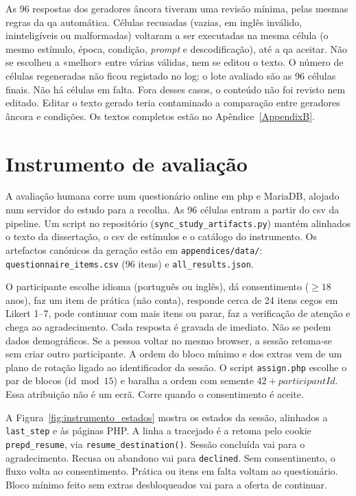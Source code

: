 As 96 respostas dos geradores âncora tiveram uma revisão mínima, pelas mesmas regras da \gls{qa} automática. Células recusadas (vazias, em inglês inválido, ininteligíveis ou malformadas) voltaram a ser executadas na mesma célula (o mesmo estímulo, época, condição, \textit{prompt} e descodificação), até a \gls{qa} aceitar. Não se escolheu a «melhor» entre várias válidas, nem se editou o texto. O número de células regeneradas não ficou registado no log; o lote avaliado são as 96 células finais. Não há células em falta. Fora desses casos, o conteúdo não foi revisto nem editado. Editar o texto gerado teria contaminado a comparação entre geradores âncora e condições. Os textos completos estão no Apêndice~\ref{AppendixB}.


\section{Instrumento de avaliação}
\label{sec:impl_questionario}

A avaliação humana corre num questionário online em \gls{php} e MariaDB, alojado num servidor do estudo para a recolha. As 96 células entram a partir do \gls{csv} da pipeline. Um script no repositório (\texttt{sync\_study\_artifacts.py}) mantém alinhados o texto da dissertação, o \gls{csv} de estímulos e o catálogo do instrumento. Os artefactos canónicos da geração estão em \texttt{appendices/data/}: \texttt{questionnaire\_items.csv} (96 itens) e \texttt{all\_results.json}.

O participante escolhe idioma (português ou inglês), dá consentimento (\(\ge 18\) anos), faz um item de prática (não conta), responde cerca de 24 itens cegos em Likert 1--7, pode continuar com mais itens ou parar, faz a verificação de atenção e chega ao agradecimento. Cada resposta é gravada de imediato. Não se pedem dados demográficos. Se a pessoa voltar no mesmo browser, a sessão retoma-se sem criar outro participante. A ordem do bloco mínimo e dos extras vem de um plano de rotação ligado ao identificador da sessão. O script \texttt{assign.php} escolhe o par de blocos (\(\mathrm{id}\bmod 15\)) e baralha a ordem com semente \(42 + \textit{participantId}\). Essa atribuição não é um ecrã. Corre quando o consentimento é aceite.

A Figura~\ref{fig:instrumento_estados} mostra os estados da sessão, alinhados a \texttt{last\_step} e às páginas PHP. A linha a tracejado é a retoma pelo cookie \texttt{prepd\_resume}, via \texttt{resume\_destination()}. Sessão concluída vai para o agradecimento. Recusa ou abandono vai para \texttt{declined}. Sem consentimento, o fluxo volta ao consentimento. Prática ou itens em falta voltam ao questionário. Bloco mínimo feito sem extras desbloqueados vai para a oferta de continuar.

